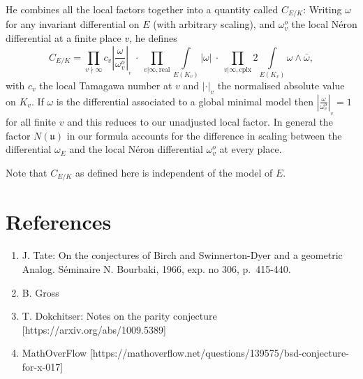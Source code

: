 \documentclass{amsart}
\begin{document}
He combines all the local factors together into a quantity called
\(C_{E/K}\): Writing \(\omega\) for any invariant differential on \(E\)
(with arbitrary scaling), and \(\omega_v^o\) the local Néron
differential at a finite place \(v\), he defines \[
  C_{E/K} = \prod_{v\nmid\infty} c_v \left\vert\frac{\omega}{\omega_v^o}\right\vert_{_v}
    \>\cdot\>\prod_{{v|\infty},{\text{real}}} \int\limits_{E(K_v)}\!\! |\omega|
    \>\cdot\>\prod_{{v|\infty},{\text{cplx}}} 2\!\!\!\int\limits_{E(K_v)}\!\! \omega\wedge \bar\omega,
\] with \(c_v\) the local Tamagawa number at \(v\) and \(|\cdot|_v\) the
normalised absolute value on \(K_v\). If \(\omega\) is the differential
associated to a global minimal model then
\(\left\vert\frac{\omega}{\omega_v^o}\right\vert_{_v}=1\) for all finite
\(v\) and this reduces to our unadjusted local factor. In general the
factor \(N(\mathfrak{u})\) in our formula accounts for the difference in
scaling between the differential \(\omega_E\) and the local Néron
differential \(\omega_v^o\) at every place.

Note that \(C_{E/K}\) as defined here is independent of the model of
\(E\).

\section{References}\label{references}

\begin{enumerate}
\def\labelenumi{\arabic{enumi}.}
\item
  J. Tate: On the conjectures of Birch and Swinnerton-Dyer and a
  geometric Analog. Séminaire N. Bourbaki, 1966, exp. no 306,
  p.~415-440.
\item
  B. Gross
\item
  T. Dokchitser: Notes on the parity conjecture
  {[}https://arxiv.org/abs/1009.5389{]}
\item
  MathOverFlow
  {[}https://mathoverflow.net/questions/139575/bsd-conjecture-for-x-017{]}
\end{enumerate}
\end{document}
